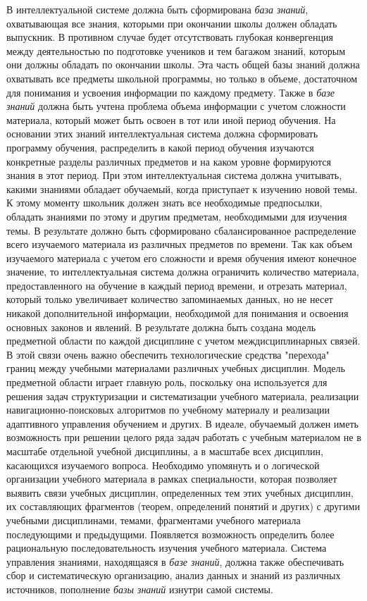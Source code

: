 В интеллектуальной системе должна быть сформирована \textit{база знаний}, охватывающая все знания, которыми при окончании школы должен обладать выпускник. В противном случае будет отсутствовать глубокая конвергенция между деятельностью по подготовке учеников и тем багажом знаний, которым они должны обладать по окончании школы. Эта часть общей базы знаний должна охватывать все предметы школьной программы, но только в объеме, достаточном для понимания и усвоения информации по каждому предмету. Также в \textit{базе знаний} должна быть учтена проблема объема информации с учетом сложности материала, который может быть освоен в тот или иной период обучения. На основании этих знаний интеллектуальная система должна сформировать программу обучения, распределить в какой период обучения изучаются конкретные разделы различных предметов и на каком уровне формируются знания в этот период. При этом интеллектуальная система должна учитывать, какими знаниями обладает обучаемый, когда приступает к изучению новой темы. К этому моменту школьник должен знать все необходимые предпосылки, обладать знаниями по этому и другим предметам, необходимыми для изучения темы. В результате должно быть сформировано сбалансированное распределение всего изучаемого материала из различных предметов по времени. Так как объем изучаемого материала с учетом его сложности и время обучения имеют конечное значение, то интеллектуальная система должна ограничить количество материала, предоставленного на обучение в каждый период времени, и отрезать материал, который только увеличивает количество запоминаемых данных, но не несет никакой дополнительной информации, необходимой для понимания и освоения основных законов и явлений. В результате должна быть создана модель предметной области по каждой дисциплине с учетом междисциплинарных связей. В этой связи очень важно обеспечить технологические средства "перехода"{} границ между учебными материалами различных учебных дисциплин. Модель предметной области играет главную роль, поскольку она используется для решения задач структуризации и систематизации учебного материала, реализации навигационно-поисковых алгоритмов по учебному материалу и реализации адаптивного управления обучением и других. В идеале, обучаемый должен иметь возможность при решении целого ряда задач работать с учебным материалом не в масштабе отдельной учебной дисциплины, а в масштабе всех дисциплин, касающихся изучаемого вопроса. Необходимо упомянуть и о логической организации учебного материала в рамках специальности, которая позволяет выявить связи учебных дисциплин, определенных тем этих учебных дисциплин, их составляющих фрагментов (теорем, определений понятий и других) с другими учебными дисциплинами, темами, фрагментами учебного материала последующими и предыдущими. Появляется возможность определить более рациональную последовательность изучения учебного материала. Система управления знаниями, находящаяся в \textit{базе знаний}, должна также обеспечивать сбор и систематическую организацию, анализ данных и знаний из различных источников, пополнение \textit{базы знаний} изнутри самой системы. 

